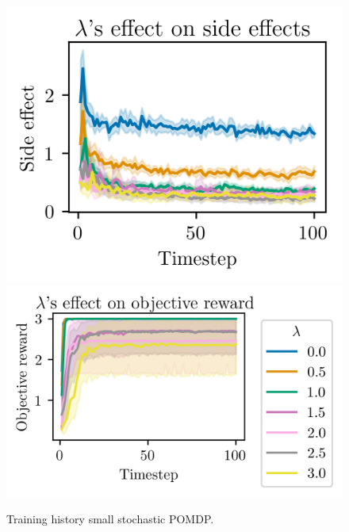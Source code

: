 \documentclass[12pt,A4]{report}
\theoremstyle{definition}
\begin{document}
\begin{appendices}
\begin{figure}[H]
  \centering
  \includegraphics{"./figures/pomdp_8x8_stochastic_side_effects.png"}
  \includegraphics{"./figures/pomdp_8x8_stochastic_objective_reward.png"}
  \caption{Training history small stochastic POMDP.}
  \label{fig:apendix_results_pomdp_8x8_stochastic}
\end{figure}


\end{appendices}
\end{document}

